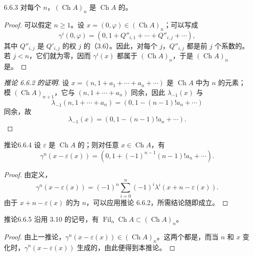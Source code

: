 \begin{SGAresult}{}{6.6.3}
对每个 $n$，$(\operatorname{Ch}A)_n$ 是 $\operatorname{Ch}A$ 的。
\end{SGAresult}
\begin{proof}
可以假定 $n\geqslant1$。设 $x=(0,\varphi)\in(\operatorname{Ch}A)_n$；可以写成
\[
\gamma^i(0,\varphi)=(0,1+Q''_{i,1}+\cdots+Q''_{i,j}+\cdots),
\]
其中 $Q''_{i,j}$ 是 $Q'_{i,j}$ 的权 $j$ 的（3.6）。因此，对每个 $j$，$Q''_{i,j}$ 都是前 $j$ 个系数的。若 $j<n$，它们就为零，因而 $\gamma^i(x)$ 都属于 $(\operatorname{Ch}A)_n$，于是
$(\operatorname{Ch}A)_n$ 是。
\end{proof}
\begin{proof}[推论 6.6.2 的证明]
设 $x=(n,1+a_1+\cdots+a_n+\cdots)$ 是 $\operatorname{Ch}A$ 中为 $n$ 的元素；模 $(\operatorname{Ch}A)_{n+1}$，它与 $(n,1+\cdots+a_n)$ 同余，因此 $\lambda_{-1}(x)$ 与
\[
\lambda_{-1}(n,1+\cdots+a_n)=(0,1-(n-1)!a_n+\cdots)
\]
同余，故
\[
\lambda_{-1}(x)=(0,1-(n-1)!a_n+\cdots).
\]
\end{proof}

\begin{SGAresult}{推论}{6.6.4}
设 $\varepsilon$ 是 $\operatorname{Ch}A$ 的；则对任意 $x\in\operatorname{Ch}A$，有
\[
\gamma^n(x-\varepsilon(x))
 =(0,1+(-1)^{n-1}(n-1)!a_n+\cdots).
\]
\end{SGAresult}
\begin{proof}
由定义，
\[
\gamma^n(x-\varepsilon(x))
 =(-1)^n\sum_{i=0}^n(-1)^i\lambda^i(x+n-\varepsilon(x)).
\]
由于 $x+n-\varepsilon(x)$ 的为 $n$，可以应用推论 6.6.2，所需结论随即成立。
\end{proof}

\begin{SGAresult}{推论}{6.6.5}
沿用 3.10 的记号，有
$\operatorname{Fil}_n\operatorname{Ch}A\subset(\operatorname{Ch}A)_n$。
\end{SGAresult}
\begin{proof}
由上一推论，$\gamma^n(x-\varepsilon(x))\in(\operatorname{Ch}A)_n$。这两个都是，而当 $n$ 和 $x$ 变化时，$\gamma^n(x-\varepsilon(x))$ 生成的，由此便得到本推论。
\end{proof}

